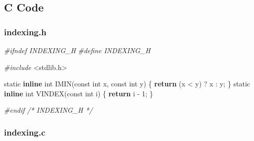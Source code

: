 \documentclass[12pt,]{article}
\newenvironment{Shaded}{\begin{snugshade}}{\end{snugshade}}
\newcommand{\KeywordTok}[1]{\textcolor[rgb]{0.13,0.29,0.53}{\textbf{#1}}}
\newcommand{\DataTypeTok}[1]{\textcolor[rgb]{0.13,0.29,0.53}{#1}}
\newcommand{\DecValTok}[1]{\textcolor[rgb]{0.00,0.00,0.81}{#1}}
\newcommand{\ImportTok}[1]{#1}
\newcommand{\CommentTok}[1]{\textcolor[rgb]{0.56,0.35,0.01}{\textit{#1}}}
\newcommand{\ControlFlowTok}[1]{\textcolor[rgb]{0.13,0.29,0.53}{\textbf{#1}}}
\newcommand{\PreprocessorTok}[1]{\textcolor[rgb]{0.56,0.35,0.01}{\textit{#1}}}
\newcommand{\NormalTok}[1]{#1}
\begin{document}
\subsection{C Code}\label{c-code}

\subsubsection{indexing.h}\label{indexing.h}

\begin{Shaded}
\begin{Highlighting}[]
\PreprocessorTok{#ifndef INDEXING_H}
\PreprocessorTok{#define INDEXING_H}

\PreprocessorTok{#include }\ImportTok{<stdlib.h>}

\DataTypeTok{static} \KeywordTok{inline} \DataTypeTok{int}\NormalTok{ IMIN(}\DataTypeTok{const} \DataTypeTok{int}\NormalTok{ x, }\DataTypeTok{const} \DataTypeTok{int}\NormalTok{ y) \{ }\ControlFlowTok{return}\NormalTok{ (x < y) ? x : y; \}}
\DataTypeTok{static} \KeywordTok{inline} \DataTypeTok{int}\NormalTok{ VINDEX(}\DataTypeTok{const} \DataTypeTok{int}\NormalTok{ i) \{ }\ControlFlowTok{return}\NormalTok{ i - }\DecValTok{1}\NormalTok{; \}}

\PreprocessorTok{#endif }\CommentTok{/* INDEXING_H */}
\end{Highlighting}
\end{Shaded}

\subsubsection{indexing.c}\label{indexing.c}
\end{document}
